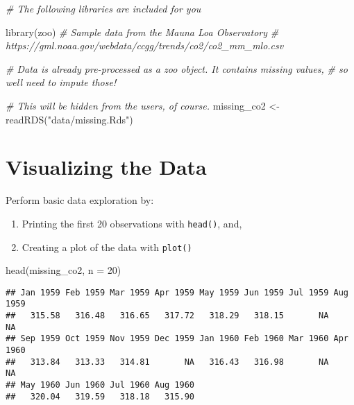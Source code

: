 \documentclass[
]{book}
\newenvironment{Shaded}{\begin{snugshade}}{\end{snugshade}}
\newcommand{\AttributeTok}[1]{\textcolor[rgb]{0.77,0.63,0.00}{#1}}
\newcommand{\CommentTok}[1]{\textcolor[rgb]{0.56,0.35,0.01}{\textit{#1}}}
\newcommand{\DecValTok}[1]{\textcolor[rgb]{0.00,0.00,0.81}{#1}}
\newcommand{\FunctionTok}[1]{\textcolor[rgb]{0.00,0.00,0.00}{#1}}
\newcommand{\NormalTok}[1]{#1}
\newcommand{\OtherTok}[1]{\textcolor[rgb]{0.56,0.35,0.01}{#1}}
\newcommand{\StringTok}[1]{\textcolor[rgb]{0.31,0.60,0.02}{#1}}
\providecommand{\tightlist}{%
  \setlength{\itemsep}{0pt}\setlength{\parskip}{0pt}}
\begin{document}
\begin{Shaded}
\begin{Highlighting}[]
\CommentTok{\# The following libraries are included for you}

\FunctionTok{library}\NormalTok{(zoo)}
\CommentTok{\# Sample data from the Mauna Loa Observatory}
\CommentTok{\# https://gml.noaa.gov/webdata/ccgg/trends/co2/co2\_mm\_mlo.csv}

\CommentTok{\# Data is already pre{-}processed as a \textasciigrave{}zoo\textasciigrave{} object. It contains missing values,}
\CommentTok{\# so we\textquotesingle{}ll need to impute those!}

\CommentTok{\# This will be hidden from the users, of course.}
\NormalTok{missing\_co2 }\OtherTok{\textless{}{-}} \FunctionTok{readRDS}\NormalTok{(}\StringTok{"data/missing.Rds"}\NormalTok{)}
\end{Highlighting}
\end{Shaded}

\newpage

\hypertarget{visualizing-the-data}{%
\section{Visualizing the Data}\label{visualizing-the-data}}

Perform basic data exploration by:

\begin{enumerate}
\def\labelenumi{\arabic{enumi}.}
\tightlist
\item
  Printing the first 20 observations with \texttt{head()}, and,
\item
  Creating a plot of the data with \texttt{plot()}
\end{enumerate}

\begin{Shaded}
\begin{Highlighting}[]
\FunctionTok{head}\NormalTok{(missing\_co2, }\AttributeTok{n =} \DecValTok{20}\NormalTok{)}
\end{Highlighting}
\end{Shaded}

\begin{verbatim}
## Jan 1959 Feb 1959 Mar 1959 Apr 1959 May 1959 Jun 1959 Jul 1959 Aug 1959 
##   315.58   316.48   316.65   317.72   318.29   318.15       NA       NA 
## Sep 1959 Oct 1959 Nov 1959 Dec 1959 Jan 1960 Feb 1960 Mar 1960 Apr 1960 
##   313.84   313.33   314.81       NA   316.43   316.98       NA       NA 
## May 1960 Jun 1960 Jul 1960 Aug 1960 
##   320.04   319.59   318.18   315.90
\end{verbatim}
\end{document}
